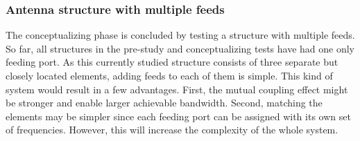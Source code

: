 \subsubsection{Antenna structure with multiple feeds}
\label{sec:multiple_feeds}
\vspace{-3pt}
The conceptualizing phase is concluded by testing a structure with multiple feeds. So far, all structures in the pre-study and conceptualizing tests have had one only feeding port. As this currently studied structure consists of three separate but closely located elements, adding feeds to each of them is simple. This kind of system would result in a few advantages. First, the mutual coupling effect might be stronger and enable larger achievable bandwidth. Second, matching the elements may be simpler since each feeding port can be assigned with its own set of frequencies. However, this will increase the complexity of the whole system.

